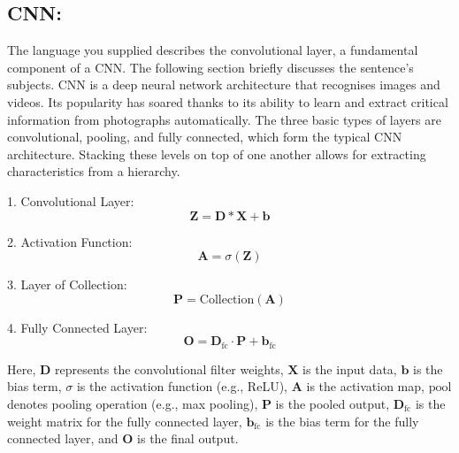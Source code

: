 \documentclass[a4paper,fleqn]{cas-sc}
\begin{document}
\subsection{CNN:} The language you supplied describes the convolutional layer, a fundamental component of a CNN. The following section briefly discusses the sentence's subjects. CNN is a deep neural network architecture that recognises images\cite{hao2018optimized,chauhan2018convolutional} and videos\cite{fan2016video,he2021automatic,qi2018cnn}. Its popularity has soared thanks to its ability to learn and extract critical information from photographs automatically. The three basic types of layers are convolutional, pooling, and fully connected, which form the typical CNN architecture. Stacking these levels on top of one another allows for extracting characteristics from a hierarchy\cite{torres2021deep}.

1. Convolutional Layer:
\begin{equation}
\mathbf{Z} = \mathbf{D} * \mathbf{X} + \mathbf{b}
\end{equation}

2. Activation Function:
\begin{equation}
\mathbf{A} = \sigma(\mathbf{Z})
\end{equation}

3. Layer of Collection:
\begin{equation}
\mathbf{P} = \text{Collection}(\mathbf{A})
\end{equation}

4. Fully Connected Layer:
\begin{equation}
\mathbf{O} = \mathbf{D}_\text{fc} \cdot \mathbf{P} + \mathbf{b}_\text{fc}
\end{equation}

Here, $\mathbf{D}$ represents the convolutional filter weights, $\mathbf{X}$ is the input data, $\mathbf{b}$ is the bias term, $\sigma$ is the activation function (e.g., ReLU), $\mathbf{A}$ is the activation map, $\text{pool}$ denotes pooling operation (e.g., max pooling), $\mathbf{P}$ is the pooled output, $\mathbf{D}_\text{fc}$ is the weight matrix for the fully connected layer, $\mathbf{b}_\text{fc}$ is the bias term for the fully connected layer, and $\mathbf{O}$ is the final output.
\end{document}
